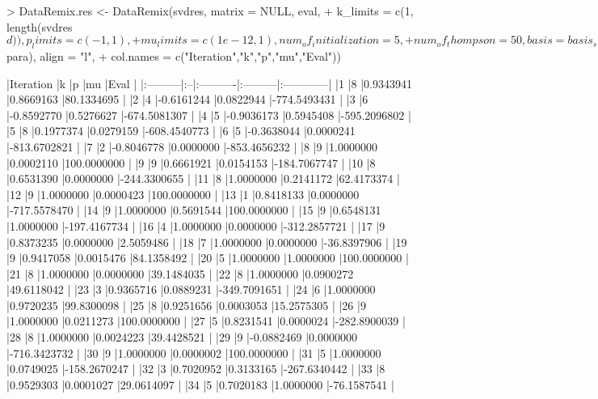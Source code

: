 \documentclass{article}
\begin{document}
\begin{Schunk}
\begin{Sinput}
> DataRemix.res <- DataRemix(svdres, matrix = NULL, eval, 
+                  k_limits = c(1, length(svdres$d)), p_limits = c(-1,1), 
+                  mu_limits = c(1e-12,1), num_of_initialization = 5, 
+                  num_of_thompson = 50, basis = basis_short, xi = 0.1, 
+                  full = T, verbose = F, X = X, penalty = 100)
> knitr::kable(cbind(1:55,DataRemix.res$para), align = "l", 
+              col.names = c("Iteration","k","p","mu","Eval"))
\end{Sinput}
\begin{Soutput}
|Iteration |k  |p          |mu        |Eval         |
|:---------|:--|:----------|:---------|:------------|
|1         |8  |0.9343941  |0.8669163 |80.1334695   |
|2         |4  |-0.6161244 |0.0822944 |-774.5493431 |
|3         |6  |-0.8592770 |0.5276627 |-674.5081307 |
|4         |5  |-0.9036173 |0.5945408 |-595.2096802 |
|5         |8  |0.1977374  |0.0279159 |-608.4540773 |
|6         |5  |-0.3638044 |0.0000241 |-813.6702821 |
|7         |2  |-0.8046778 |0.0000000 |-853.4656232 |
|8         |9  |1.0000000  |0.0002110 |100.0000000  |
|9         |9  |0.6661921  |0.0154153 |-184.7067747 |
|10        |8  |0.6531390  |0.0000000 |-244.3300655 |
|11        |8  |1.0000000  |0.2141172 |62.4173374   |
|12        |9  |1.0000000  |0.0000423 |100.0000000  |
|13        |1  |0.8418133  |0.0000000 |-717.5578470 |
|14        |9  |1.0000000  |0.5691544 |100.0000000  |
|15        |9  |0.6548131  |1.0000000 |-197.4167734 |
|16        |4  |1.0000000  |0.0000000 |-312.2857721 |
|17        |9  |0.8373235  |0.0000000 |2.5059486    |
|18        |7  |1.0000000  |0.0000000 |-36.8397906  |
|19        |9  |0.9417058  |0.0015476 |84.1358492   |
|20        |5  |1.0000000  |1.0000000 |100.0000000  |
|21        |8  |1.0000000  |0.0000000 |39.1484035   |
|22        |8  |1.0000000  |0.0900272 |49.6118042   |
|23        |3  |0.9365716  |0.0889231 |-349.7091651 |
|24        |6  |1.0000000  |0.9720235 |99.8300098   |
|25        |8  |0.9251656  |0.0003053 |15.2575305   |
|26        |9  |1.0000000  |0.0211273 |100.0000000  |
|27        |5  |0.8231541  |0.0000024 |-282.8900039 |
|28        |8  |1.0000000  |0.0024223 |39.4428521   |
|29        |9  |-0.0882469 |0.0000000 |-716.3423732 |
|30        |9  |1.0000000  |0.0000002 |100.0000000  |
|31        |5  |1.0000000  |0.0749025 |-158.2670247 |
|32        |3  |0.7020952  |0.3133165 |-267.6340442 |
|33        |8  |0.9529303  |0.0001027 |29.0614097   |
|34        |5  |0.7020183  |1.0000000 |-76.1587541  |

\end{Soutput}
\end{Schunk}
\end{document}
